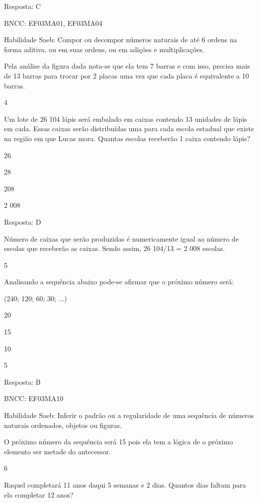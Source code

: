 \begin{escolha}
{\begin{escolha}
{Resposta: C

BNCC: EF03MA01, EF03MA04

Habilidade Saeb: Compor ou decompor números naturais de até 6 ordens na
forma aditiva, ou em suas ordens, ou em adições e multiplicações.

Pela análise da figura dada nota-se que ela tem 7 barras e com isso,
precisa mais de 13 barras para trocar por 2 placas uma vez que cada
placa é equivalente a 10 barras.

\num{4}

Um lote de 26 104 lápis será embalado em caixas contendo 13 unidades de
lápis em cada. Essas caixas serão distribuídas uma para cada escola
estadual que existe na região em que Lucas mora. Quantas escolas
receberão 1 caixa contendo lápis?

\begin{escolha}
\item
  26
\item
  28
\item
  208
\item
  2 008
\end{escolha}

Resposta: D

Número de caixas que serão produzidas é numericamente igual ao número de
escolas que receberão as caixas. Sendo assim, 26 104/13 = 2 008 escolas.

\num{5}

Analisando a sequência abaixo pode-se afirmar que o próximo número será:

(240; 120; 60; 30; ...)

\begin{escolha}
\item
  20
\item
  15
\item
  10
\item
  5
\end{escolha}

Resposta: B

BNCC: EF03MA10

Habilidade Saeb: Inferir o padrão ou a regularidade de uma sequência de
números naturais ordenados, objetos ou figuras.

O próximo número da sequência será 15 pois ela tem a lógica de o próximo
elemento ser metade do antecessor.

\num{6}

Raquel completará 11 anos daqui 5 semanas e 2 dias. Quantos dias faltam
para ela completar 12 anos?

}
\end{escolha}}
\end{escolha}
